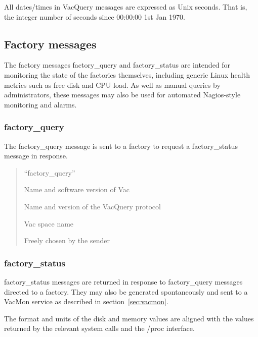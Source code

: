 \documentclass[12pt,a4paper]{article}
\begin{document}
All dates/times in VacQuery messages are expressed as Unix seconds. That
is, the integer number of seconds since 00:00:00 1st Jan 1970.

\subsection{Factory messages}
\label{sec:factorymessages}

The factory messages factory\_query and factory\_status are intended
for monitoring the state of the factories themselves, including
generic Linux health metrics such as free disk and CPU load. As well
as manual queries by administrators, these messages may also be
used for automated Nagios-style monitoring and alarms.

\subsubsection{factory\_query}
\label{sec:factoryquery}

The factory\_query message is sent to a factory to request a 
factory\_status message in response.

\begin{quote}
\begin{description}
\setlength{\parskip}{0pt}
\item[message\_type] ``factory\_query''
\item[vac\_version] Name and software version of Vac
\item[vacquery\_version] Name and version of the VacQuery protocol
\item[space] Vac space name
\item[cookie] Freely chosen by the sender
\end{description}
\end{quote}

\subsubsection{factory\_status}
\label{sec:factorystatus}

factory\_status messages are returned in response to 
factory\_query messages directed to a factory. They may
also be generated spontaneously and sent to a VacMon
service as described in section~\ref{sec:vacmon}.

The format and units of the disk and memory values are
aligned with the values returned by the relevant system
calls and the /proc interface.
\end{document}
